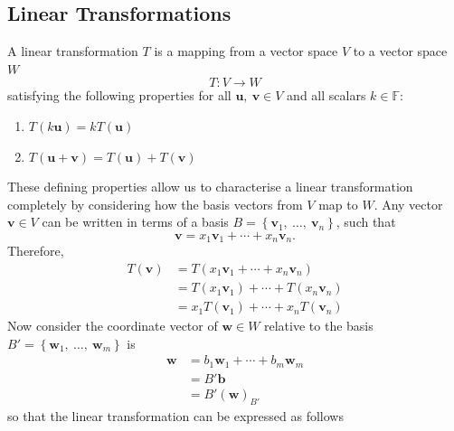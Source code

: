 \documentclass{article}
\begin{document}
\subsection{Linear Transformations}
A linear transformation \(T\) is a mapping from a vector space \(V\) to
a vector space \(W\)
\begin{equation*}
    T:V \to W
\end{equation*}
satisfying the following properties for all \(\symbf{u},\: \symbf{v} \in V\) and all
scalars \(k \in \mathbb{F}\):
\begin{enumerate}
    \item \(T\left( k\symbf{u} \right) = k T\left( \symbf{u} \right)\)
    \item \(T\left( \symbf{u} + \symbf{v} \right) = T\left( \symbf{u} \right) + T\left( \symbf{v} \right)\)
\end{enumerate}
These defining properties allow us to characterise a linear transformation completely
by considering how the basis vectors from \(V\) map to \(W\). Any vector \(\symbf{v} \in V\)
can be written in terms of a basis \(B = \left\{ \symbf{v}_1,\: \dots,\: \symbf{v}_n \right\}\), such that
\begin{equation*}
    \symbf{v} = x_1 \symbf{v}_1 + \cdots + x_n \symbf{v}_n.
\end{equation*}
Therefore,
\begin{align*}
    T\left( \symbf{v} \right) & = T\left( x_1 \symbf{v}_1 + \cdots + x_n \symbf{v}_n \right)                 \\
                              & = T\left( x_1 \symbf{v}_1 \right) + \cdots + T\left( x_n \symbf{v}_n \right) \\
                              & = x_1 T\left( \symbf{v}_1 \right) + \cdots + x_n T\left( \symbf{v}_n \right)
\end{align*}
Now consider the coordinate vector of \(\symbf{w} \in W\) relative to the basis \(B' = \left\{ \symbf{w}_1,\: \dots,\: \symbf{w}_m \right\}\) is
\begin{align*}
    \symbf{w} & = b_1 \symbf{w}_1 + \cdots + b_m \symbf{w}_m \\
              & = B' \symbf{b}                               \\
              & = B' \left( \symbf{w} \right)_{B'}
\end{align*}
so that the linear transformation can be expressed as follows
\end{document}
